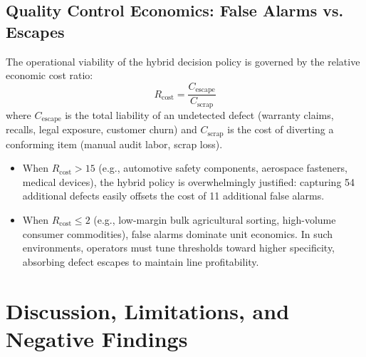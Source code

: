 \documentclass[journal]{IEEEtran}
\begin{document}
\subsection{Quality Control Economics: False Alarms vs. Escapes}
The operational viability of the hybrid decision policy is governed by the relative economic cost ratio:
\begin{equation}
R_{\text{cost}} = \frac{C_{\text{escape}}}{C_{\text{scrap}}}
\end{equation}
where $C_{\text{escape}}$ is the total liability of an undetected defect (warranty claims, recalls, legal exposure, customer churn) and $C_{\text{scrap}}$ is the cost of diverting a conforming item (manual audit labor, scrap loss).
\begin{itemize}
    \item When $R_{\text{cost}} > 15$ (e.g., automotive safety components, aerospace fasteners, medical devices), the hybrid policy is overwhelmingly justified: capturing 54 additional defects easily offsets the cost of 11 additional false alarms.
    \item When $R_{\text{cost}} \le 2$ (e.g., low-margin bulk agricultural sorting, high-volume consumer commodities), false alarms dominate unit economics. In such environments, operators must tune thresholds toward higher specificity, absorbing defect escapes to maintain line profitability.
\end{itemize}

\section{Discussion, Limitations, and Negative Findings}
\end{document}

